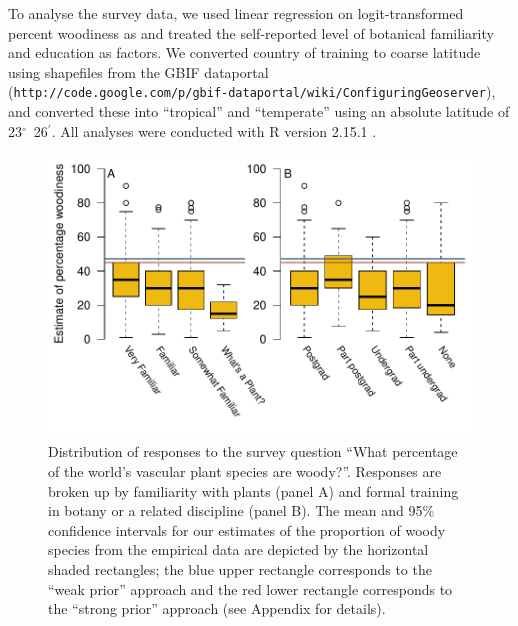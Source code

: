 \documentclass[a4paper,12pt]{article}
\begin{document}
To analyse the survey data, we used linear regression on
logit-transformed percent woodiness as \citep[see][]{wartonarcsine}
and treated the self-reported level of botanical familiarity and
education as factors.  We converted country of training to coarse
latitude using shapefiles
from the GBIF dataportal\\
(\texttt{http://code.google.com/p/gbif-dataportal/wiki/ConfiguringGeoserver}),
and converted these into ``tropical'' and ``temperate'' using an
absolute latitude of 23$^\circ$~26$^\prime$.  All analyses were
conducted with R version 2.15.1 \citep{R}.





\begin{figure}[p]
  \centering
  \includegraphics{figs/survey-results}
  \caption{Distribution of responses to the survey question ``What
    percentage of the world's vascular plant species are
    woody?''. Responses are broken up by familiarity with plants
    (panel A) and formal training in botany or a related discipline
    (panel B). The mean and 95\% confidence intervals for our
    estimates of the proportion of woody species from the empirical
    data are depicted by the horizontal shaded rectangles; the blue
    upper rectangle corresponds to the ``weak prior'' approach and the
    red lower rectangle corresponds to the ``strong prior'' approach
    (see Appendix for details).}
  \label{fig:survey}
\end{figure}
\end{document}
